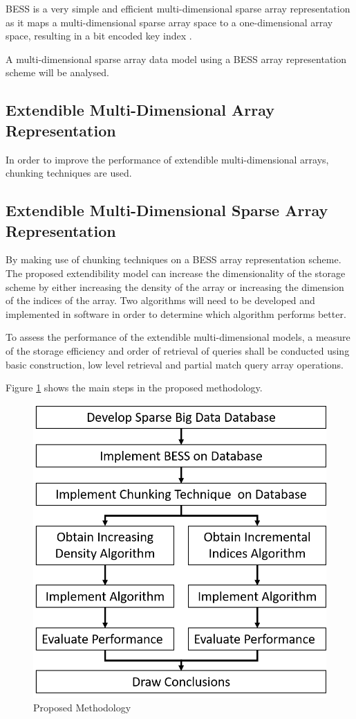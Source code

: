 BESS is a very simple and efficient multi-dimensional sparse array representation as it maps a multi-dimensional sparse array space to a one-dimensional array space, resulting in a bit encoded key index \cite{wang:2014sar}.

A multi-dimensional sparse array data model using a BESS array representation scheme will be analysed.
\subsection{Extendible Multi-Dimensional Array Representation}
In order to improve the performance of extendible multi-dimensional arrays, chunking techniques are used.

\subsection{Extendible Multi-Dimensional Sparse Array Representation}
 By making use of chunking techniques on a BESS array representation scheme. The proposed extendibility model can increase the dimensionality of the storage scheme by either increasing the density of the array or increasing the dimension of the indices of the array. Two algorithms will need to be developed and implemented in software in order to determine which algorithm performs better.
 
 To assess the performance of the extendible multi-dimensional models, a measure of the storage efficiency and order of retrieval of queries shall be conducted using basic construction, low level retrieval and partial match query array operations.
 
 Figure \ref{fig:proposedmethod} shows the main steps in the proposed methodology.

 
 \begin{figure}
 	\centering
 	\includegraphics[width=0.7\linewidth]{proposedMethod}
 	\caption{Proposed Methodology}
 	\label{fig:proposedmethod}
 \end{figure}
 